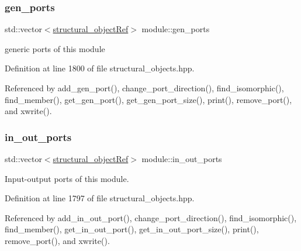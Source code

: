 \subsubsection{\texorpdfstring{gen\+\_\+ports}{gen\_ports}}
{\footnotesize\ttfamily std\+::vector$<$\hyperlink{structural__objects_8hpp_a8ea5f8cc50ab8f4c31e2751074ff60b2}{structural\+\_\+object\+Ref}$>$ module\+::gen\+\_\+ports\hspace{0.3cm}{\ttfamily [private]}}



generic ports of this module 



Definition at line 1800 of file structural\+\_\+objects.\+hpp.



Referenced by add\+\_\+gen\+\_\+port(), change\+\_\+port\+\_\+direction(), find\+\_\+isomorphic(), find\+\_\+member(), get\+\_\+gen\+\_\+port(), get\+\_\+gen\+\_\+port\+\_\+size(), print(), remove\+\_\+port(), and xwrite().

\mbox{\label{classmodule_a7ce36ee0a25a7d1b7ab120051baf7858}} 
\subsubsection{\texorpdfstring{in\+\_\+out\+\_\+ports}{in\_out\_ports}}
{\footnotesize\ttfamily std\+::vector$<$\hyperlink{structural__objects_8hpp_a8ea5f8cc50ab8f4c31e2751074ff60b2}{structural\+\_\+object\+Ref}$>$ module\+::in\+\_\+out\+\_\+ports\hspace{0.3cm}{\ttfamily [private]}}



Input-\/output ports of this module. 



Definition at line 1797 of file structural\+\_\+objects.\+hpp.



Referenced by add\+\_\+in\+\_\+out\+\_\+port(), change\+\_\+port\+\_\+direction(), find\+\_\+isomorphic(), find\+\_\+member(), get\+\_\+in\+\_\+out\+\_\+port(), get\+\_\+in\+\_\+out\+\_\+port\+\_\+size(), print(), remove\+\_\+port(), and xwrite().

\mbox{\label{classmodule_a6bc6140e8f911a97b35fc5ffa412c96f}} 
